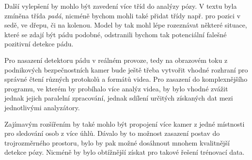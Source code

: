 Další vylepšení by mohlo být zavedení více tříd do analýzy pózy. V textu byla
zmíněna třída \textit{padá}, nicméně bychom mohli také přidat třídy např. pro
pozici v sedě, ve dřepu, či na kolenou. Model by tak mohl lépe rozeznávat
některé situace, které se zdají být pádu podobné, odstranili bychom tak
potenciální falešné pozitivní detekce pádu.

Pro nasazení detektoru pádu v reálném provoze, tedy na obrazovém toku z
podnikových bezpečnostních kamer bude ještě třeba vytvořit vhodné rozhraní pro
správné čtení různých protokolů a formátů videa. Pro zasazení do komplexnějšího
programu, ve kterém by probíhalo více analýz videa, by bylo vhodné zvážit
jednak jejich paralelní zpracování, jednak sdílení určitých získaných dat mezi
jednotlivými analyzátory.

Zajímavým rozšířením by také mohlo být propojení více kamer z jedné místnosti
pro sledování osob z více úhlů. Dávalo by to možnost zasazení postav do
trojrozměrného prostoru, bylo by pak možné dosáhnout mnohem kvalitnější detekce
pózy. Nicméně by bylo obtížnější získat pro takové řešení trénovací data.

\endinput